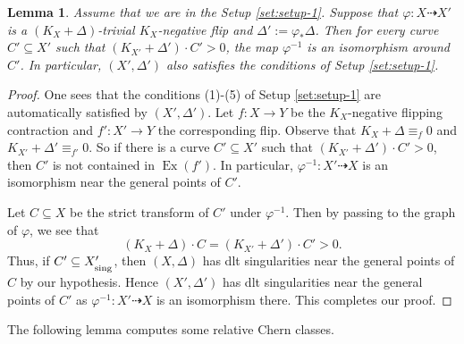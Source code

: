 \documentclass[12pt]{amsart}
\newcommand{\<}{\leq}
\def\vphi{\varphi}
\def\subset{\subseteq}
\newcommand{\num}{\equiv}
\newcommand{\bir}{\dashrightarrow}
\newtheorem{lemma}[theorem]{Lemma}
\theoremstyle{remark}
\theoremstyle{definition}
\theoremstyle{definition}
\numberwithin{equation}{section}
\theoremstyle{definition}
\theoremstyle{definition}
\def\Ex{\operatorname{Ex}}
\def\sing{\operatorname{\textsubscript{\rm sing}}}
\begin{document}
\begin{lemma}\label{lem:flip-invariance}
 Assume that we are in the Setup \ref{set:setup-1}. 
 Suppose that $\vphi \colon  X\bir X'$ is a $(K_X+\Delta)$-trivial $K_X$-negative flip and $\Delta':=\vphi_*\Delta$. 
 Then for every curve $C' \subseteq X'$ such that $ (K_{X'}+\Delta')\cdot C'  >0$, the map $\varphi^{-1}$ is an isomorphism around $C'$.
 In particular, $(X', \Delta')$ also satisfies the conditions of Setup \ref{set:setup-1}.    
\end{lemma}

\begin{proof}
One sees that the conditions (1)-(5) of Setup \ref{set:setup-1} are automatically satisfied by $(X', \Delta')$. 
Let  $f\colon X\to Y$ be the $K_X$-negative flipping contraction and $f' \colon  X'\to Y$ the corresponding flip. 
Observe that $K_X+\Delta\num_f 0$ and $K_{X'}+\Delta'\num_{f'} 0$. 
So if there is a curve $C'\subset X'$ such that $(K_{X'}+\Delta')\cdot C'>0$, then $C'$ is not contained in $\Ex(f')$.  
In particular, $\vphi^{-1}\colon X'\bir X$ is an isomorphism near the general points of $C'$. 

Let $C\subset X$ be the strict transform of $C'$ under $\vphi^{-1}$. 
Then by passing to the graph of $\vphi$, we see that 
\[ (K_X+\Delta)\cdot C  = (K_{X'}+\Delta')\cdot C'  >0.\]
Thus, if $C'\subseteq X'_{\sing}$, then  $(X, \Delta)$ has dlt singularities near the general points of $C$  by our hypothesis.   
Hence $(X', \Delta')$ has dlt singularities near the general points of $C'$ as $\vphi^{-1}\colon X' \bir X$ is an isomorphism there.  
This completes our proof. 
\end{proof}


 

The following lemma computes some relative Chern classes.
\end{document}
